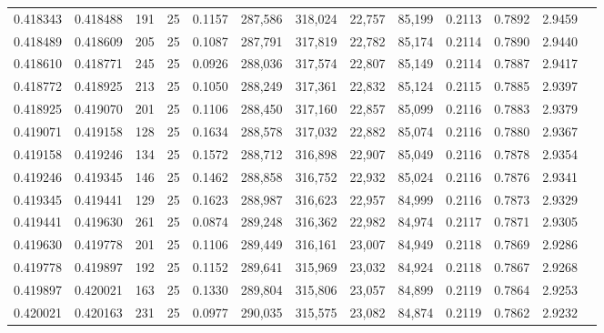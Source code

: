 \begin{tabular}{rrrrrrrrrrrrr}
0.418343 & 0.418488 &   191 &  25 &                                     0.1157 & 287,586 & 318,024 &  22,757 &  85,199 & 0.2113 & 0.7892 & 2.9459 \\
0.418489 & 0.418609 &   205 &  25 &                                     0.1087 & 287,791 & 317,819 &  22,782 &  85,174 & 0.2114 & 0.7890 & 2.9440 \\
0.418610 & 0.418771 &   245 &  25 &                                     0.0926 & 288,036 & 317,574 &  22,807 &  85,149 & 0.2114 & 0.7887 & 2.9417 \\
0.418772 & 0.418925 &   213 &  25 &                                     0.1050 & 288,249 & 317,361 &  22,832 &  85,124 & 0.2115 & 0.7885 & 2.9397 \\
0.418925 & 0.419070 &   201 &  25 &                                     0.1106 & 288,450 & 317,160 &  22,857 &  85,099 & 0.2116 & 0.7883 & 2.9379 \\
0.419071 & 0.419158 &   128 &  25 &                                     0.1634 & 288,578 & 317,032 &  22,882 &  85,074 & 0.2116 & 0.7880 & 2.9367 \\
0.419158 & 0.419246 &   134 &  25 &                                     0.1572 & 288,712 & 316,898 &  22,907 &  85,049 & 0.2116 & 0.7878 & 2.9354 \\
0.419246 & 0.419345 &   146 &  25 &                                     0.1462 & 288,858 & 316,752 &  22,932 &  85,024 & 0.2116 & 0.7876 & 2.9341 \\
0.419345 & 0.419441 &   129 &  25 &                                     0.1623 & 288,987 & 316,623 &  22,957 &  84,999 & 0.2116 & 0.7873 & 2.9329 \\
0.419441 & 0.419630 &   261 &  25 &                                     0.0874 & 289,248 & 316,362 &  22,982 &  84,974 & 0.2117 & 0.7871 & 2.9305 \\
0.419630 & 0.419778 &   201 &  25 &                                     0.1106 & 289,449 & 316,161 &  23,007 &  84,949 & 0.2118 & 0.7869 & 2.9286 \\
0.419778 & 0.419897 &   192 &  25 &                                     0.1152 & 289,641 & 315,969 &  23,032 &  84,924 & 0.2118 & 0.7867 & 2.9268 \\
0.419897 & 0.420021 &   163 &  25 &                                     0.1330 & 289,804 & 315,806 &  23,057 &  84,899 & 0.2119 & 0.7864 & 2.9253 \\
0.420021 & 0.420163 &   231 &  25 &                                     0.0977 & 290,035 & 315,575 &  23,082 &  84,874 & 0.2119 & 0.7862 & 2.9232 \\

\end{tabular}
